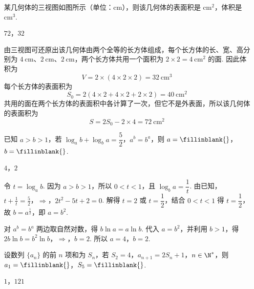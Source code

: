 \begin{problem}
某几何体的三视图如图所示（单位：\(\mathrm{cm}\)），则该几何体的表面积是\fillinblank{} \(\mathrm{cm}^2\)，体积是\fillinblank{} \(\mathrm{cm}^3\).

\end{problem}

\begin{answer}
\(72\)，\(32\)
\end{answer}

\begin{solution}
由三视图可还原出该几何体由两个全等的长方体组成，每个长方体的长、宽、高分别为 \(4\mathrm{~cm}\)、\(2\mathrm{~cm}\)、\(2\mathrm{~cm}\)，两个长方体共用一个面积为 \(2\times2=4\mathrm{~cm}^2\) 的面. 因此体积为
\[
V=2\times(4\times2\times2)=32\mathrm{~cm}^3
\]
每个长方体的表面积为
\[
S_0=2(4\times2+4\times2+2\times2)=40\mathrm{~cm}^2
\]
共用的面在两个长方体的表面积中各计算了一次，但它不是外表面，所以该几何体的表面积为
\[
S=2S_0-2\times4=72\mathrm{~cm}^2
\]
\end{solution}

\begin{problem}
已知 \( a>b>1 \)，若 \( \log_a b+\log_b a=\dfrac52 \)，\( a^b=b^a \)，则 \( a=\fillinblank{} \)，\( b=\fillinblank{} \).
\end{problem}

\begin{answer}
\(4\)，\(2\)
\end{answer}

\begin{solution}
令 \(t=\log_a b\). 因为 \(a>b>1\)，所以 \(0<t<1\)，且 \(\log_ba=\dfrac1t\). 由已知，
\(t+\frac1t=\frac52\)，\(\Longrightarrow\)，\(2t^2-5t+2=0\).
解得 \(t=2\) 或 \(t=\dfrac12\)，结合 \(0<t<1\) 得 \(t=\dfrac12\)，故 \(b=a^{\frac{1}{2}}\)，即 \(a=b^2\).

对 \(a^b=b^a\) 两边取自然对数，得 \(b\ln a=a\ln b\). 代入 \(a=b^2\)，并利用 \(b>1\)，得
\(2b\ln b=b^2\ln b\)，\(\Longrightarrow\)，\(b=2\).
所以 \(a=4\)，\(b=2\).
\end{solution}

\begin{problem}
设数列 \( \{a_n\} \) 的前 \( n \) 项和为 \( S_n \)，若 \( S_2=4 \)，\( a_{n+1}=2S_n+1 \)，\( n\in\N^* \)，则 \( a_1=\fillinblank{} \)，\( S_5=\fillinblank{} \).
\end{problem}

\begin{answer}
\(1\)，\(121\)
\end{answer}

